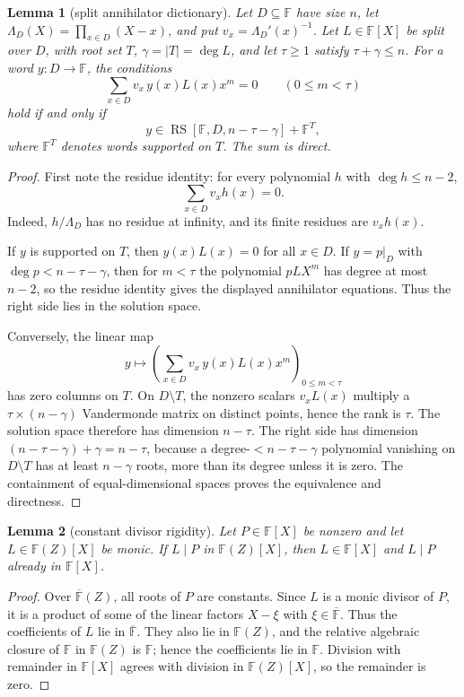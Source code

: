 \documentclass[a4paper,11pt]{amsart}
\newtheorem{lemma}[lemma]{Lemma}
\theoremstyle{remark}
\newcommand{\F}{\mathbb F}
\newcommand{\RS}{\operatorname{RS}}
\begin{document}
\begin{lemma}[split annihilator dictionary]\label{lem:split-annihilator}
Let \(D\subseteq\F\) have size \(n\), let \(\Lambda_D(X)=\prod_{x\in D}(X-x)\), and put \(v_x=\Lambda_D'(x)^{-1}\).  Let \(L\in\F[X]\) be split over \(D\), with root set \(T\), \(\gamma=|T|=\deg L\), and let \(\tau\ge1\) satisfy \(\tau+\gamma\le n\).  For a word \(y:D\to\F\), the conditions
\[
        \sum_{x\in D}v_x\,y(x)L(x)x^m=0
        \qquad(0\le m<\tau)
\]
hold if and only if
\[
        y\in \RS[\F,D,n-\tau-\gamma]+\F^T,
\]
where \(\F^T\) denotes words supported on \(T\).  The sum is direct.
\end{lemma}

\begin{proof}
First note the residue identity: for every polynomial \(h\) with \(\deg h\le n-2\),
\[
        \sum_{x\in D}v_xh(x)=0.
\]
Indeed, \(h/\Lambda_D\) has no residue at infinity, and its finite residues are \(v_xh(x)\).

If \(y\) is supported on \(T\), then \(y(x)L(x)=0\) for all \(x\in D\).  If \(y=p|_D\) with \(\deg p<n-\tau-\gamma\), then for \(m<\tau\) the polynomial \(pLX^m\) has degree at most \(n-2\), so the residue identity gives the displayed annihilator equations.  Thus the right side lies in the solution space.

Conversely, the linear map
\[
        y\longmapsto
        \left(\sum_{x\in D}v_x\,y(x)L(x)x^m\right)_{0\le m<\tau}
\]
has zero columns on \(T\).  On \(D\setminus T\), the nonzero scalars \(v_xL(x)\) multiply a \(\tau\times(n-\gamma)\) Vandermonde matrix on distinct points, hence the rank is \(\tau\).  The solution space therefore has dimension \(n-\tau\).  The right side has dimension \((n-\tau-\gamma)+\gamma=n-\tau\), because a degree-\(<n-\tau-\gamma\) polynomial vanishing on \(D\setminus T\) has at least \(n-\gamma\) roots, more than its degree unless it is zero.  The containment of equal-dimensional spaces proves the equivalence and directness.
\end{proof}

\begin{lemma}[constant divisor rigidity]\label{lem:constant-divisor}
Let \(P\in\F[X]\) be nonzero and let \(L\in\F(Z)[X]\) be monic.  If \(L\mid P\) in \(\F(Z)[X]\), then \(L\in\F[X]\) and \(L\mid P\) already in \(\F[X]\).
\end{lemma}

\begin{proof}
Over \(\overline{\F}(Z)\), all roots of \(P\) are constants.  Since \(L\) is a monic divisor of \(P\), it is a product of some of the linear factors \(X-\xi\) with \(\xi\in\overline{\F}\).  Thus the coefficients of \(L\) lie in \(\overline{\F}\).  They also lie in \(\F(Z)\), and the relative algebraic closure of \(\F\) in \(\F(Z)\) is \(\F\); hence the coefficients lie in \(\F\).  Division with remainder in \(\F[X]\) agrees with division in \(\F(Z)[X]\), so the remainder is zero.
\end{proof}
\end{document}
